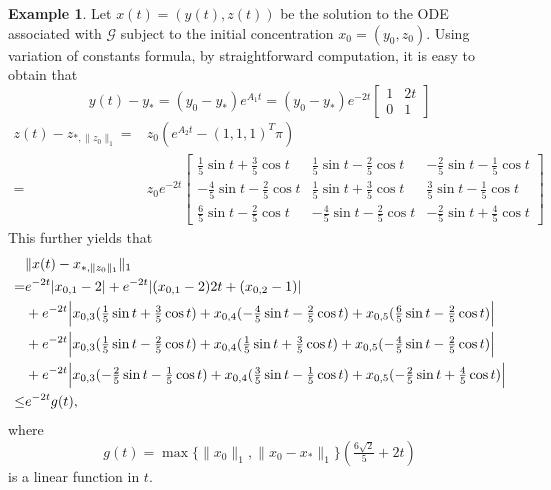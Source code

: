 \documentclass[10pt]{amsart}
\numberwithin{equation}{section}
\theoremstyle{plain}
\theoremstyle{definition}
\newtheorem{example}[theorem]{Example}
\theoremstyle{remark}
\newcommand{\cG}{\mathcal{G}}
\begin{document}
\begin{example}
Let $x(t)=(y(t),z(t))$ be the solution to the  ODE associated with $\cG$ subject to the initial concentration $x_0=(y_0,z_0)$. Using variation of constants formula, by straightforward computation, it is easy to obtain that
\[y(t)-y_* = (y_0-y_*)e^{A_1t} = (y_0-y_*)e^{-2 t}
\begin{bmatrix}
 1 & 2 t\\
 0 & 1
\end{bmatrix}\]
\begin{align*}
z(t)-z_{*,\|z_0\|_1} =& z_{0}(e^{A_2t}-(1,1,1)^T\pi)\\
=& z_{0}e^{-2 t}\begin{bmatrix}
 \frac{1}{5}  \sin t+\frac{3}{5}  \cos t & \frac{1}{5}  \sin t-\frac{2}{5} \cos t& -\frac{2}{5} \sin t-\frac{1}{5}  \cos t\\
 -\frac{4}{5} \sin t-\frac{2}{5}\cos t& \frac{1}{5} \sin t+\frac{3}{5} \cos t& \frac{3}{5} \sin t-\frac{1}{5}  \cos t\\
 \frac{6}{5} \sin t-\frac{2}{5} \cos t & -\frac{4}{5}  \sin t-\frac{2}{5} \cos t& -\frac{2}{5}  \sin t+\frac{4}{5} \cos t
\end{bmatrix}
\end{align*}
This further yields that \begin{equation}\label{eq:expression_of_solution}
\begin{split}
&\|x(t)-x_{*,\|z_0\|_1}\|_1 \\
= & e^{-2t}|x_{0,1}-2|+e^{-2t}|(x_{0,1}-2)2t+(x_{0,2}-1)|\\
& +e^{-2t}\Bigl|x_{0,3}(\tfrac{1}{5}\sin t+\tfrac{3}{5}\cos t)+x_{0,4}(-\tfrac{4}{5}\sin t-\tfrac{2}{5}\cos t)+x_{0,5}(\tfrac{6}{5}\sin t-\tfrac{2}{5}\cos t)\Bigr|\\
&+e^{-2t}\Bigl|x_{0,3}(\tfrac{1}{5}\sin t-\tfrac{2}{5}\cos t)+x_{0,4}(\tfrac{1}{5}\sin t+\tfrac{3}{5}\cos t)+x_{0,5}(-\tfrac{4}{5}\sin t-\tfrac{2}{5}\cos t)\Bigr|\\
&+e^{-2t}\Bigl|x_{0,3}(-\tfrac{2}{5}\sin t-\tfrac{1}{5}\cos t)+x_{0,4}(\tfrac{3}{5}\sin t-\tfrac{1}{5}\cos t)+x_{0,5}(-\tfrac{2}{5}\sin t+\tfrac{4}{5}\cos t)\Bigr|\\
\le&e^{-2t}g(t),
\end{split}
\end{equation}
where $$g(t)=\max\{\|x_0\|_1,\|x_0-x_*\|_1\}(\tfrac{6\sqrt{2}}{5}+2t)$$ is a linear function in $t$.
\end{example}
\end{document}
